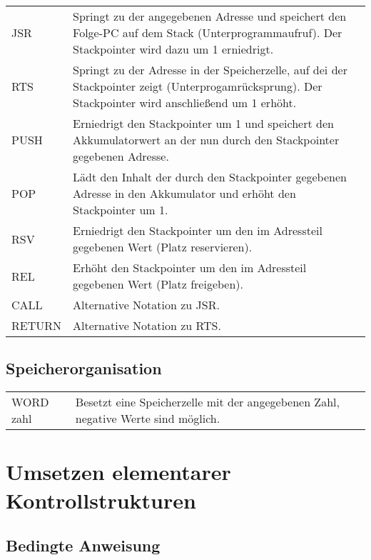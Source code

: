\documentclass{lehramt-informatik-haupt}
\begin{document}
\begin{tabularx}{\linewidth}{lX}
JSR           & Springt zu der angegebenen Adresse und speichert den Folge-PC auf dem Stack (Unterprogrammaufruf).  Der Stackpointer wird dazu um 1 erniedrigt. \\
RTS           & Springt zu der Adresse in der Speicherzelle, auf dei der Stackpointer zeigt (Unterprogamrücksprung).  Der Stackpointer wird anschließend um 1 erhöht. \\
PUSH          & Erniedrigt den Stackpointer um 1 und speichert den Akkumulatorwert an der nun durch den Stackpointer gegebenen Adresse. \\
POP           & Lädt den Inhalt der durch den Stackpointer gegebenen Adresse in den Akkumulator und erhöht den Stackpointer um 1. \\
RSV           & Erniedrigt den Stackpointer um den im Adressteil gegebenen Wert (Platz reservieren). \\
REL           & Erhöht den Stackpointer um den im Adressteil gegebenen Wert (Platz freigeben). \\
CALL          & Alternative Notation zu JSR. \\
RETURN        & Alternative Notation zu RTS. \\
\end{tabularx}

\subsection{Speicherorganisation}

\begin{tabularx}{\linewidth}{lX}
WORD zahl     & Besetzt eine Speicherzelle mit der angegebenen Zahl, negative Werte sind möglich. \\
\end{tabularx}

%

\section{Umsetzen elementarer Kontrollstrukturen}

%

\subsection{Bedingte Anweisung}
\end{document}
